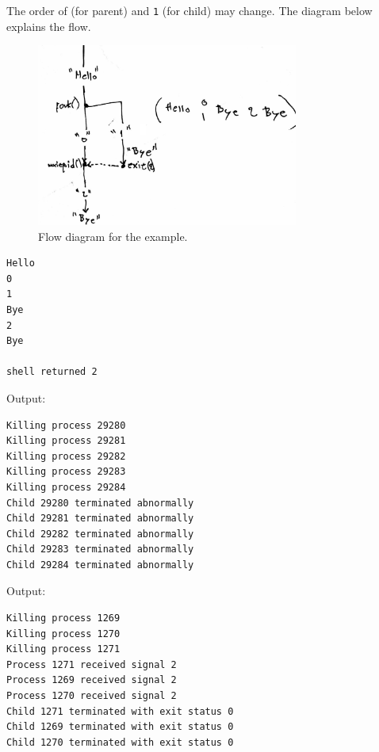\documentclass[a4paper]{article}
\begin{document}
The order of  (for parent) and \texttt{1} (for child) may change. The diagram below explains the flow.
\begin{figure}[H]
    \centering
    \includegraphics[height=6cm]{img/fork_waitpid_sol.jpg}
    \caption{Flow diagram for the example.}
\end{figure}
\begin{verbatim}
Hello
0
1
Bye
2
Bye

shell returned 2
\end{verbatim}

\begin{exmp}
\textup{

} %
\end{exmp}
Output:
\begin{verbatim}
Killing process 29280
Killing process 29281
Killing process 29282
Killing process 29283
Killing process 29284
Child 29280 terminated abnormally
Child 29281 terminated abnormally
Child 29282 terminated abnormally
Child 29283 terminated abnormally
Child 29284 terminated abnormally
\end{verbatim}

Output:
\begin{verbatim}
Killing process 1269
Killing process 1270
Killing process 1271
Process 1271 received signal 2
Process 1269 received signal 2
Process 1270 received signal 2
Child 1271 terminated with exit status 0
Child 1269 terminated with exit status 0
Child 1270 terminated with exit status 0

\end{verbatim}
\end{document}
